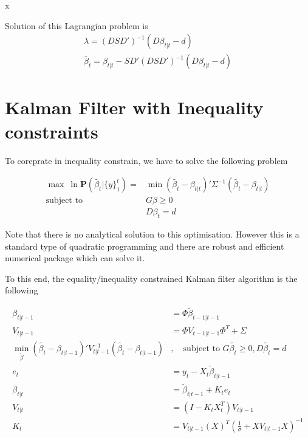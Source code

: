 \message{ !name(kalman_filter.tex)}x\documentclass{article}
\numberwithin{algorithm}{section}
\theoremstyle{plain}
\theoremstyle{definition}
\theoremstyle{remark}
\newcommand{\PP}{\mathbf{P}}
\begin{document}
Solution of this Lagrangian problem is 
\begin{eqnarray}
\lambda = (D S D')^{-1} ( D \beta_{t|t}- d)\\
\tilde{\beta_t} = \beta_{t|t} - S D' ( D S D')^{-1} (D \beta_{t|t} - d)
\end{eqnarray}
\section{Kalman Filter with Inequality constraints}
To coreprate in inequality constrain, we have to solve the following problem 

\begin{equation}
\begin{split}
\max \: \ln \PP(\tilde{\beta_t} | \{y\}^t_1) = &\min (\tilde{\beta_t}  - \beta_{t|t})' \Sigma^{-1} (\tilde{\beta_t}  - \beta_{t|t})\\
\mbox{subject to } & G\beta \geq 0 \\ & D\beta_t = d
\end{split}
\end{equation}

Note that there is no analytical solution to this optimisation. However this is a standard type of quadratic programming and there are robust and efficient numerical package which can solve it.

To this end, the equality/inequality constrained Kalman filter algorithm is the following

\begin{equation}
\begin{split}
\beta_{t|t-1} &=\Phi \tilde{ \beta}_{t-1|t-1}\\
V_{t|t-1} &= \Phi V_{t-1|t-1}\Phi^T  + \Sigma \\
\min_{\tilde{\beta}} (\tilde{\beta_t}  - \beta_{t|t-1})' V_{t|t-1}^{-1} (\tilde{\beta_t}  - \beta_{t|t-1})&, \quad \mbox{subject to } G\tilde{\beta_t} \geq 0 ,D \tilde{\beta_t} = d\\
e_t &= y_t -  X_t\tilde{ \beta}_{t|t-1} \\
\beta_{t|t} &= \tilde{\beta}_{t|t-1} + K_t e_t\\
V_{t|t} &= (I - K_t X_t^T) V_{t|t-1}\\
K_t &=  V_{t|t-1} (X)^T (\frac1\sigma + X V_{t|t-1} X )^{-1}
\end{split}
\end{equation}
\end{document}
